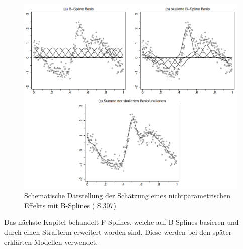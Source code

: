 \documentclass[12pt]{scrreprt}
\begin{document}
\begin{figure}[H]
	\centering
	\includegraphics[width=\linewidth]{plots/b_spline.png}
	\caption{Schematische Darstellung der Schätzung eines nichtparametrischen Effekts mit B-Splines (\cite{fahrmeir2007regression} S.307)}
	\label{pic:b_spline}
\end{figure}

\noindent Das nächste Kapitel behandelt P-Splines, welche auf B-Splines basieren und durch einen Strafterm erweitert worden sind. Diese werden  bei den später erklärten Modellen verwendet.
\end{document}
